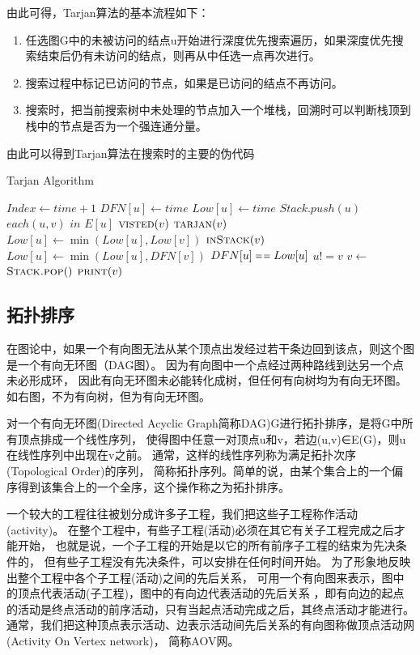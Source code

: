 由此可得，Tarjan算法的基本流程如下：
\begin{enumerate}
\item 任选图G中的未被访问的结点u开始进行深度优先搜索遍历，如果深度优先搜索结束后仍有未访问的结点，则再从中任选一点再次进行。
\item 搜索过程中标记已访问的节点，如果是已访问的结点不再访问。
\item 搜索时，把当前搜索树中未处理的节点加入一个堆栈，回溯时可以判断栈顶到栈中的节点是否为一个强连通分量。
\end{enumerate}

由此可以得到Tarjan算法在搜索时的主要的伪代码
\begin{algorithm} 
\caption {Tarjan Algorithm} 
\begin{codebox}
\li	$Index \leftarrow time + 1$
\li	$DFN[u] \leftarrow time$
\li	$Low[u] \leftarrow time$
\li	$Stack.push(u)$
\li	\For $each (u, v)$ $in$ $E[u]$
\li		\Do  \If $\textnormal{\scshape visted}(v)$
\li			\Then
				$\textnormal{\scshape tarjan}(v)$                  
\li            			$Low[u] \leftarrow \min(Low[u], Low[v])$
\li        		 \ElseIf $\textnormal{\scshape inStack}(v)$ 
\li            			\Then $Low[u] \leftarrow \min(Low[u], DFN[v])$
			\End
		\End
\li	\If $DFN[u] \isequal Low[u]$
\li		\Then \While $u != v$
\li				\Do $v \leftarrow$ $\textnormal{\scshape Stack.pop}()$                  
\li            				$\textnormal{\scshape print}(v)$
				\End 
		\End
\end{codebox}
\end{algorithm} 

\subsection{拓扑排序}
在图论中，如果一个有向图无法从某个顶点出发经过若干条边回到该点，则这个图是一个有向无环图（DAG图）。
因为有向图中一个点经过两种路线到达另一个点未必形成环，
因此有向无环图未必能转化成树，但任何有向树均为有向无环图。如右图，不为有向树，但为有向无环图。

对一个有向无环图(Directed Acyclic Graph简称DAG)G进行拓扑排序，是将G中所有顶点排成一个线性序列，
使得图中任意一对顶点u和v，若边(u,v)∈E(G)，则u在线性序列中出现在v之前。
通常，这样的线性序列称为满足拓扑次序(Topological Order)的序列，
简称拓扑序列。简单的说，由某个集合上的一个偏序得到该集合上的一个全序，这个操作称之为拓扑排序。

一个较大的工程往往被划分成许多子工程，我们把这些子工程称作活动(activity)。
在整个工程中，有些子工程(活动)必须在其它有关子工程完成之后才能开始，
也就是说，一个子工程的开始是以它的所有前序子工程的结束为先决条件的，
但有些子工程没有先决条件，可以安排在任何时间开始。
为了形象地反映出整个工程中各个子工程(活动)之间的先后关系，
可用一个有向图来表示，图中的顶点代表活动(子工程)，图中的有向边代表活动的先后关系
，即有向边的起点的活动是终点活动的前序活动，只有当起点活动完成之后，其终点活动才能进行。
通常，我们把这种顶点表示活动、边表示活动间先后关系的有向图称做顶点活动网(Activity On Vertex network)，
简称AOV网。

